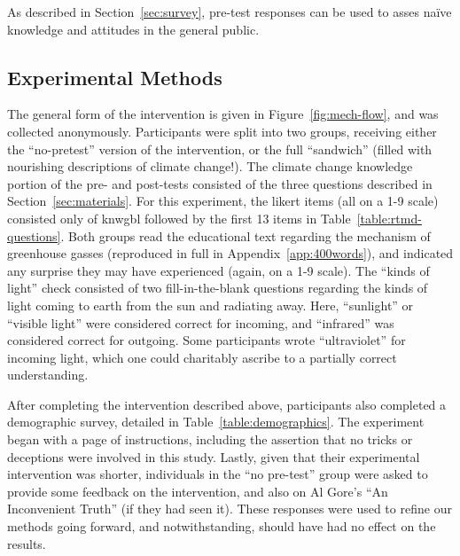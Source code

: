 As described in Section~\ref{sec:survey}, pre-test responses can be used to
asses na\"ive knowledge and attitudes in the general public. 


\subsection{Experimental Methods}

The general form of the intervention is given in Figure~\ref{fig:mech-flow}, and
was collected anonymously.  Participants were split into two groups, receiving
either the “no-pretest” version of the intervention, or the full “sandwich”
(filled with nourishing descriptions of climate change!). The climate change
knowledge portion of the pre- and post-tests consisted of the three questions
described in Section~\ref{sec:materials}. For this experiment, the likert items
(all on a 1-9 scale) consisted only of \textsf{knwgbl} followed by the first 13
items in Table~\ref{table:rtmd-questions}. Both groups read the educational text
regarding the mechanism of greenhouse gasses (reproduced in full in
Appendix~\ref{app:400words}), and indicated any surprise they may have
experienced (again, on a 1-9 scale). The “kinds of light” check consisted of two
fill-in-the-blank questions regarding the kinds of light coming to earth from
the sun and radiating away. Here, “sunlight” or “visible light” were considered
correct for incoming, and “infrared” was considered correct for outgoing.  Some
participants wrote “ultraviolet” for incoming light, which one could charitably
ascribe to a partially correct understanding.

After completing the intervention described above, participants also
completed a demographic survey, detailed in Table~\ref{table:demographics}.
The experiment began with a page of instructions, including the assertion that
no tricks or deceptions were involved in this study. Lastly, given that their
experimental intervention was shorter, individuals in the “no pre-test” group
were asked to provide some feedback on the intervention, and also on Al Gore’s
“An Inconvenient Truth” (if they had seen it). These responses were used to
refine our methods going forward, and \textcite{bem-future} notwithstanding,
should have had no effect on the results.

